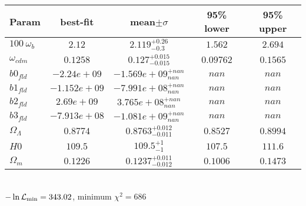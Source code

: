 \begin{tabular}{|l|c|c|c|c|} 
 \hline 
Param & best-fit & mean$\pm\sigma$ & 95\% lower & 95\% upper \\ \hline 
$100~\omega_{b }$ &$2.12$ & $2.119_{-0.3}^{+0.26}$ & $1.562$ & $2.694$ \\ 
$\omega_{cdm }$ &$0.1258$ & $0.127_{-0.015}^{+0.015}$ & $0.09762$ & $0.1565$ \\ 
$b0_{fld }$ &$-2.24e+09$ & $-1.569e+09_{nan}^{+nan}$ & $nan$ & $nan$ \\ 
$b1_{fld }$ &$-1.152e+09$ & $-7.991e+08_{nan}^{+nan}$ & $nan$ & $nan$ \\ 
$b2_{fld }$ &$2.69e+09$ & $3.765e+08_{nan}^{+nan}$ & $nan$ & $nan$ \\ 
$b3_{fld }$ &$-7.913e+08$ & $-1.081e+09_{nan}^{+nan}$ & $nan$ & $nan$ \\ 
$\Omega_{\Lambda }$ &$0.8774$ & $0.8763_{-0.011}^{+0.012}$ & $0.8527$ & $0.8994$ \\ 
$H0$ &$109.5$ & $109.5_{-1}^{+1}$ & $107.5$ & $111.6$ \\ 
$\Omega_{m }$ &$0.1226$ & $0.1237_{-0.012}^{+0.011}$ & $0.1006$ & $0.1473$ \\ 
\hline 
 \end{tabular} \\ 
$-\ln{\cal L}_\mathrm{min} =343.02$, minimum $\chi^2=686$ \\ 

